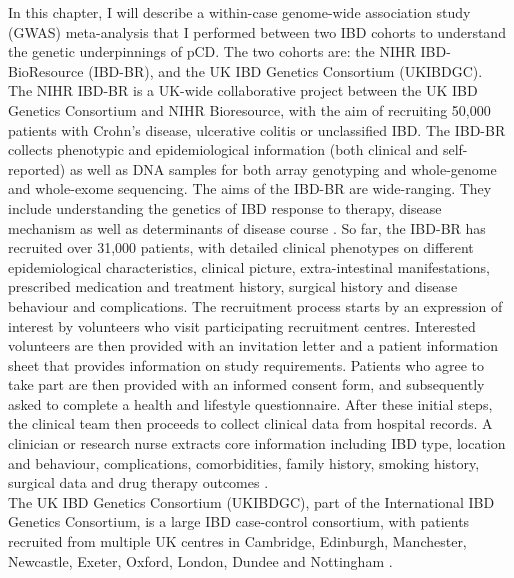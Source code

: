 In this chapter, I will describe a within-case genome-wide association study (GWAS) meta-analysis that I performed between two IBD cohorts to understand the genetic underpinnings of pCD. The two cohorts are: the NIHR IBD-BioResource (IBD-BR), and the UK IBD Genetics Consortium (UKIBDGC). \\

The NIHR IBD-BR is a UK-wide collaborative project between the UK IBD Genetics Consortium and NIHR Bioresource, with the aim of recruiting 50,000 patients with Crohn's disease, ulcerative colitis or unclassified IBD. The IBD-BR collects phenotypic and epidemiological information (both clinical and self-reported) as well as DNA samples for both array genotyping and whole-genome and whole-exome sequencing. The aims of the IBD-BR are wide-ranging. They include understanding the genetics of IBD response to therapy, disease mechanism as well as determinants of disease course \cite{ibdbr-protocol-v8,ibdbr-questionnaire-v7,ibdbr-further-info}. So far, the IBD-BR has recruited over 31,000 patients, with detailed clinical phenotypes on different epidemiological characteristics, clinical picture, extra-intestinal manifestations, prescribed medication and treatment history, surgical history and disease behaviour and complications. The recruitment process starts by an expression of interest by volunteers who visit participating recruitment centres. Interested volunteers are then provided with an invitation letter and a patient information sheet that provides information on study requirements. Patients who agree to take part are then provided with an informed consent form, and subsequently asked to complete a health and lifestyle questionnaire. After these initial steps, the clinical team then proceeds to collect clinical data from hospital records. A clinician or research nurse extracts core information including IBD type, location and behaviour, complications, comorbidities, family history, smoking history, surgical data and
drug therapy outcomes \cite{ibdbr-protocol-v8}. \\

The UK IBD Genetics Consortium (UKIBDGC), part of the International IBD Genetics Consortium, is a large IBD case-control consortium, with patients recruited from multiple UK centres in Cambridge, Edinburgh, Manchester, Newcastle, Exeter, Oxford, London, Dundee and Nottingham \cite{ukibdgc-info}.\\

